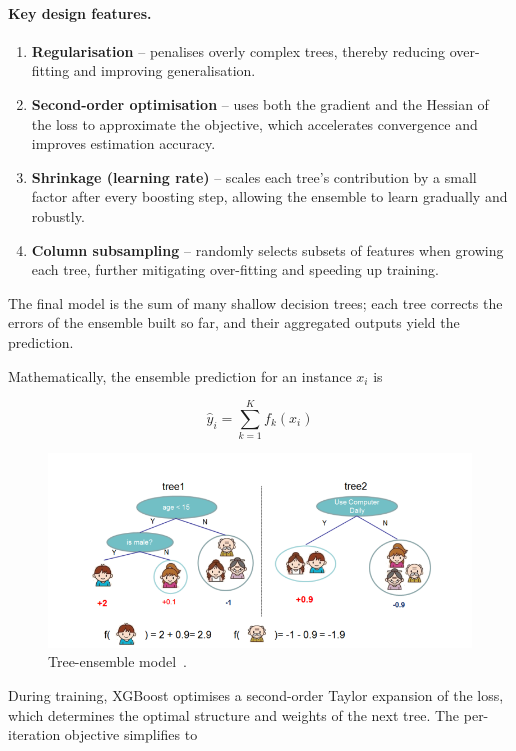 \documentclass{SGGW-thesis-EN}
\begin{document}
\paragraph{Key design features.}
\begin{enumerate}
  \item \textbf{Regularisation} – penalises overly complex trees, thereby reducing over-fitting and
        improving generalisation.
  \item \textbf{Second-order optimisation} – uses both the gradient and the Hessian of the loss to
        approximate the objective, which accelerates convergence and improves estimation accuracy.
  \item \textbf{Shrinkage (learning rate)} – scales each tree’s contribution by a small factor after
        every boosting step, allowing the ensemble to learn gradually and robustly.
  \item \textbf{Column subsampling} – randomly selects subsets of features when growing each tree,
        further mitigating over-fitting and speeding up training.
\end{enumerate}
The final model is the sum of many shallow decision trees; each tree corrects the errors of the
ensemble built so far, and their aggregated outputs yield the prediction.

Mathematically, the ensemble prediction for an instance \(x_i\) is

\begin{figure}[h!]
  \centering
  \begin{minipage}[c]{0.40\textwidth}
    \[
      \hat{y}_i = \sum_{k=1}^{K} f_k(x_i)
    \]
  \end{minipage}\hfill
  \begin{minipage}[c]{0.55\textwidth}
    \centering
    \includegraphics[width=\linewidth]{images/tree_ensemble_model.png}
    \caption{Tree-ensemble model~\cite{Chen_2016}.}\label{fig:tree_ensemble_model}
  \end{minipage}
\end{figure}
\noindent During training, XGBoost optimises a second-order Taylor expansion of the loss, which
determines the optimal structure and weights of the next tree.
The per-iteration objective simplifies to
\end{document}
